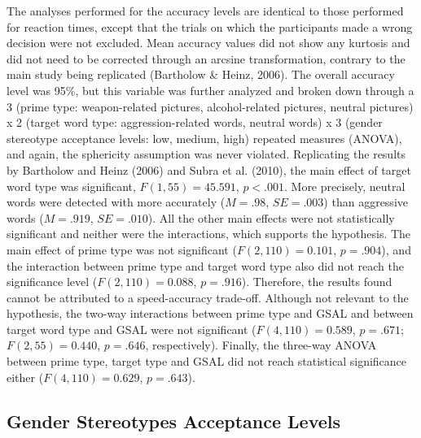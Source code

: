 \documentclass[authordate, serif, review]{jote-article}
\begin{document}
\begin{multicols}{2}
The analyses performed for the accuracy levels are identical to those performed for reaction times, except that the trials on which the participants made a wrong decision were not excluded. Mean accuracy values did not show any kurtosis and did not need to be corrected through an arcsine transformation, contrary to the main study being replicated (Bartholow \& Heinz, 2006). The overall accuracy level was 95\%, but this variable was further analyzed and broken down through a 3 (prime type: weapon-related pictures, alcohol-related pictures, neutral pictures) x 2 (target word type: aggression-related words, neutral words) x 3 (gender stereotype acceptance levels: low, medium, high) repeated measures (ANOVA), and again, the sphericity assumption was never violated. Replicating the results by Bartholow and Heinz (2006) and Subra et al. (2010), the main effect of target word type was significant, $F (1, 55) = 45.591$, $p < .001$. More precisely, neutral words were detected with more accurately ($M = .98$, $SE = .003$) than aggressive words ($M = .919$, $SE = .010$). All the other main effects were not statistically significant and neither were the interactions, which supports the hypothesis. The main effect of prime type was not significant ($F (2, 110) = 0.101$, $p = .904$), and the interaction between prime type and target word type also did not reach the significance level ($F (2, 110) = 0.088$, $p = .916$). Therefore, the results found cannot be attributed to a speed-accuracy trade-off.  Although not relevant to the hypothesis, the two-way interactions between prime type and GSAL and between target word type and GSAL were not significant ($F (4, 110) = 0.589$, $p = .671$; $F (2, 55) = 0.440$, $p = .646$, respectively). Finally, the three-way ANOVA between prime type, target type and GSAL did not reach statistical significance either ($F (4, 110) = 0.629$, $p = .643$). 


{}
\subsection*{Gender Stereotypes Acceptance Levels}


\end{multicols}
\end{document}
